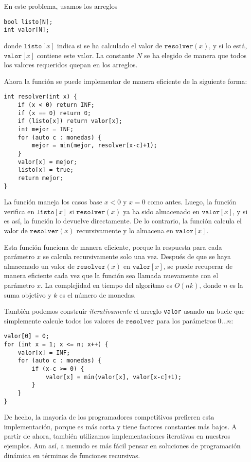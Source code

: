 En este problema, usamos los arreglos
\begin{lstlisting}
bool listo[N];
int valor[N];
\end{lstlisting}

donde $\texttt{listo}[x]$ indica
si se ha calculado el valor de $\texttt{resolver}(x)$,
y si lo está, $\texttt{valor}[x]$
contiene este valor.
La constante $N$ se ha elegido de manera que
todos los valores requeridos quepan en los arreglos.

Ahora la función se puede implementar de manera eficiente de la siguiente forma:

\begin{lstlisting}
int resolver(int x) {
    if (x < 0) return INF;
    if (x == 0) return 0;
    if (listo[x]) return valor[x];
    int mejor = INF;
    for (auto c : monedas) {
        mejor = min(mejor, resolver(x-c)+1);
    }
    valor[x] = mejor;
    listo[x] = true;
    return mejor;
}
\end{lstlisting}

La función maneja los casos base
$x<0$ y $x=0$ como antes.
Luego, la función verifica en
$\texttt{listo}[x]$ si
$\texttt{resolver}(x)$ ya ha sido almacenado
en $\texttt{valor}[x]$,
y si es así, la función lo devuelve directamente.
De lo contrario, la función calcula el valor
de $\texttt{resolver}(x)$
recursivamente y lo almacena en $\texttt{valor}[x]$.

Esta función funciona de manera eficiente,
porque la respuesta para cada parámetro $x$
se calcula recursivamente solo una vez.
Después de que se haya almacenado un valor de $\texttt{resolver}(x)$ en $\texttt{valor}[x]$,
se puede recuperar de manera eficiente cada vez que
la función sea llamada nuevamente con el parámetro $x$.
La complejidad en tiempo del algoritmo es $O(nk)$,
donde $n$ es la suma objetivo y $k$ es el número de monedas.

También podemos construir \emph{iterativamente}
el arreglo \texttt{valor} usando
un bucle que simplemente calcule todos los valores
de $\texttt{resolver}$ para los parámetros $0 \ldots n$:
\begin{lstlisting}
valor[0] = 0;
for (int x = 1; x <= n; x++) {
    valor[x] = INF;
    for (auto c : monedas) {
        if (x-c >= 0) {
            valor[x] = min(valor[x], valor[x-c]+1);
        }
    }
}
\end{lstlisting}

De hecho, la mayoría de los programadores competitivos prefieren esta
implementación, porque es más corta y tiene
factores constantes más bajos.
A partir de ahora, también utilizamos implementaciones iterativas
en nuestros ejemplos.
Aun así, a menudo es más fácil pensar en soluciones
de programación dinámica
en términos de funciones recursivas.


